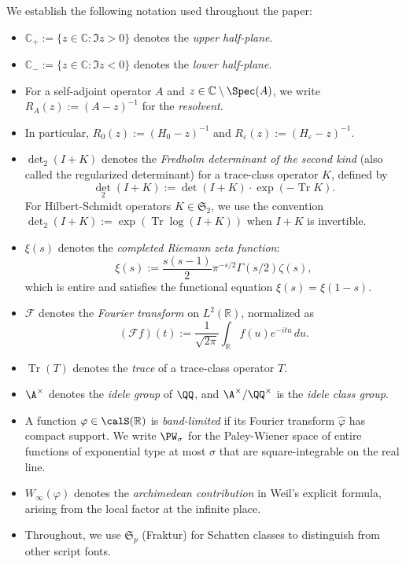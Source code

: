 ﻿\documentclass[12pt,a4paper]{article}
\theoremstyle{definition}
\theoremstyle{remark}
\newcommand{\CC}{\mathbb{C}}
\newcommand{\RR}{\mathbb{R}}
\newcommand{\Tr}{\operatorname{Tr}}
\newcommand{\F}{\mathcal{F}}
\begin{document}
We establish the following notation used throughout the paper:

\begin{itemize}
\item $\CC_+ := \{z \in \CC : \Im z > 0\}$ denotes the \emph{upper half-plane}.
\item $\CC_- := \{z \in \CC : \Im z < 0\}$ denotes the \emph{lower half-plane}.
\item For a self-adjoint operator $A$ and $z \in \CC \setminus \Spec(A)$, we write $R_A(z) := (A - z)^{-1}$ for the \emph{resolvent}.
\item In particular, $R_0(z) := (H_0 - z)^{-1}$ and $R_\varepsilon(z) := (H_\varepsilon - z)^{-1}$.
\item $\det_2(I + K)$ denotes the \emph{Fredholm determinant of the second kind} (also called the regularized determinant) for a trace-class operator $K$, defined by
\[
  \det_2(I + K) := \det(I + K) \cdot \exp(-\Tr K).
\]
For Hilbert-Schmidt operators $K \in \mathfrak{S}_2$, we use the convention $\det_2(I + K) := \exp(\Tr \log(I + K))$ when $I + K$ is invertible.
\item $\xi(s)$ denotes the \emph{completed Riemann zeta function}:
\[
  \xi(s) := \frac{s(s-1)}{2} \pi^{-s/2} \Gamma(s/2) \zeta(s),
\]
which is entire and satisfies the functional equation $\xi(s) = \xi(1-s)$.
\item $\F$ denotes the \emph{Fourier transform} on $L^2(\RR)$, normalized as
\[
  (\F f)(t) := \frac{1}{\sqrt{2\pi}} \int_\RR f(u) e^{-itu} \, du.
\]
\item $\Tr(T)$ denotes the \emph{trace} of a trace-class operator $T$.
\item $\A^\times$ denotes the \emph{idele group} of $\QQ$, and $\A^\times / \QQ^\times$ is the \emph{idele class group}.
\item A function $\varphi \in \calS(\RR)$ is \emph{band-limited} if its Fourier transform $\widehat{\varphi}$ has compact support. We write $\PW_\sigma$ for the Paley-Wiener space of entire functions of exponential type at most $\sigma$ that are square-integrable on the real line.
\item $W_\infty(\varphi)$ denotes the \emph{archimedean contribution} in Weil's explicit formula, arising from the local factor at the infinite place.
\item Throughout, we use $\mathfrak{S}_p$ (Fraktur) for Schatten classes to distinguish from other script fonts.
\end{itemize}
\end{document}
